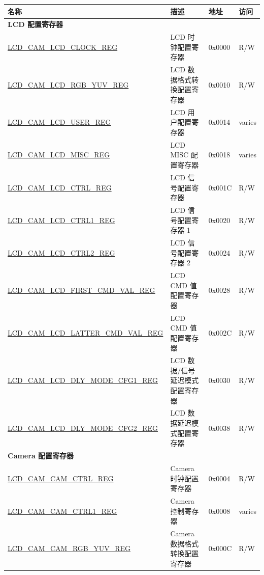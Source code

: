 \begin{longtable}{ | p{6.4cm} | p{6.8cm} | p{1.3cm} | p{1cm} | }
\hline\rowcolor{lightgray}
\textbf{名称} & \textbf{描述} &  \textbf{地址} & \textbf{访问}  \\ \hline
\endhead
\multicolumn{4}{|l|}{\textbf{LCD 配置寄存器}} \\ \hline
\hyperref[regdesc:LCDCAMLCDCLOCKREG]{LCD\_CAM\_LCD\_CLOCK\_REG} & LCD 时钟配置寄存器 & 0x0000 & R/W \\ \hline
\hyperref[regdesc:LCDCAMLCDRGBYUVREG]{LCD\_CAM\_LCD\_RGB\_YUV\_REG} & LCD 数据格式转换配置寄存器 & 0x0010 & R/W \\ \hline
\hyperref[regdesc:LCDCAMLCDUSERREG]{LCD\_CAM\_LCD\_USER\_REG} & LCD 用户配置寄存器 & 0x0014 & varies \\ \hline
\hyperref[regdesc:LCDCAMLCDMISCREG]{LCD\_CAM\_LCD\_MISC\_REG} & LCD MISC 配置寄存器 & 0x0018 & varies \\ \hline
\hyperref[regdesc:LCDCAMLCDCTRLREG]{LCD\_CAM\_LCD\_CTRL\_REG} & LCD 信号配置寄存器 & 0x001C & R/W \\ \hline
\hyperref[regdesc:LCDCAMLCDCTRL1REG]{LCD\_CAM\_LCD\_CTRL1\_REG} & LCD 信号配置寄存器 1 & 0x0020 & R/W \\ \hline
\hyperref[regdesc:LCDCAMLCDCTRL2REG]{LCD\_CAM\_LCD\_CTRL2\_REG} & LCD 信号配置寄存器 2 & 0x0024 & R/W \\ \hline
\hyperref[regdesc:LCDCAMLCDFIRSTCMDVALREG]{LCD\_CAM\_LCD\_FIRST\_CMD\_VAL\_REG} & LCD CMD 值配置寄存器 & 0x0028 & R/W \\ \hline
\hyperref[regdesc:LCDCAMLCDLATTERCMDVALREG]{LCD\_CAM\_LCD\_LATTER\_CMD\_VAL\_REG} & LCD CMD 值配置寄存器 & 0x002C & R/W \\ \hline
\hyperref[regdesc:LCDCAMLCDDLYMODECFG1REG]{LCD\_CAM\_LCD\_DLY\_MODE\_CFG1\_REG} & LCD 数据/信号延迟模式配置寄存器 & 0x0030 & R/W \\ \hline
\hyperref[regdesc:LCDCAMLCDDLYMODECFG2REG]{LCD\_CAM\_LCD\_DLY\_MODE\_CFG2\_REG} & LCD 数据延迟模式配置寄存器 & 0x0038 & R/W \\ \hline
\multicolumn{4}{|l|}{\textbf{Camera 配置寄存器}} \\ \hline
\hyperref[regdesc:LCDCAMCAMCTRLREG]{LCD\_CAM\_CAM\_CTRL\_REG} & Camera 时钟配置寄存器 & 0x0004 & R/W \\ \hline
\hyperref[regdesc:LCDCAMCAMCTRL1REG]{LCD\_CAM\_CAM\_CTRL1\_REG} & Camera 控制寄存器  & 0x0008 & varies \\ \hline
\hyperref[regdesc:LCDCAMCAMRGBYUVREG]{LCD\_CAM\_CAM\_RGB\_YUV\_REG} & Camera 数据格式转换配置寄存器 & 0x000C & R/W \\ \hline

\end{longtable}

